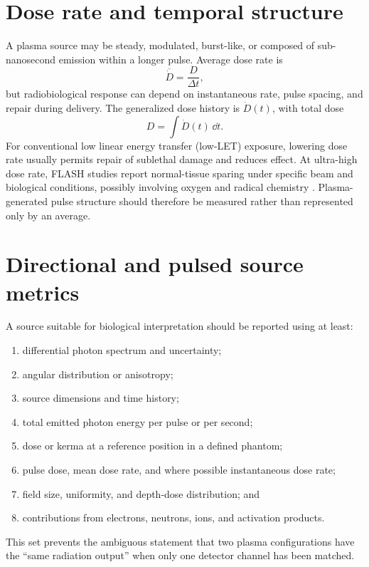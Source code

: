 \section{Dose rate and temporal structure}

A plasma source may be steady, modulated, burst-like, or composed of sub-nanosecond emission within a longer pulse. Average dose rate is
\begin{equation}
\overline{\dot D}=\frac{D}{\Delta t},
\end{equation}
but radiobiological response can depend on instantaneous rate, pulse spacing, and repair during delivery. The generalized dose history is $\dot D(t)$, with total dose
\begin{equation}
D=\int\dot D(t)\,\dd t.
\end{equation}
For conventional low linear energy transfer (low-LET) exposure, lowering dose rate usually permits repair of sublethal damage and reduces effect. At ultra-high dose rate, FLASH studies report normal-tissue sparing under specific beam and biological conditions, possibly involving oxygen and radical chemistry \cite{favaudon2014,montay2019,abolfath2020}. Plasma-generated pulse structure should therefore be measured rather than represented only by an average.

\section{Directional and pulsed source metrics}

A source suitable for biological interpretation should be reported using at least:
\begin{enumerate}
\item differential photon spectrum and uncertainty;
\item angular distribution or anisotropy;
\item source dimensions and time history;
\item total emitted photon energy per pulse or per second;
\item dose or kerma at a reference position in a defined phantom;
\item pulse dose, mean dose rate, and where possible instantaneous dose rate;
\item field size, uniformity, and depth-dose distribution; and
\item contributions from electrons, neutrons, ions, and activation products.
\end{enumerate}
This set prevents the ambiguous statement that two plasma configurations have the ``same radiation output'' when only one detector channel has been matched.

